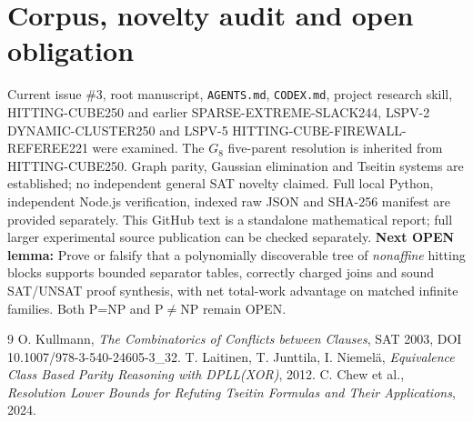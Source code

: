 \documentclass[10pt]{article}
\begin{document}
\section{Corpus, novelty audit and open obligation}
Current issue \#3, root manuscript, \texttt{AGENTS.md}, \texttt{CODEX.md}, project research skill, HITTING-CUBE250 and earlier SPARSE-EXTREME-SLACK244, LSPV-2 DYNAMIC-CLUSTER250 and LSPV-5 HITTING-CUBE-FIREWALL-REFEREE221 were examined. The $G_8$ five-parent resolution is inherited from HITTING-CUBE250. Graph parity, Gaussian elimination and Tseitin systems are established; no independent general SAT novelty claimed. Full local Python, independent Node.js verification, indexed raw JSON and SHA-256 manifest are provided separately. This GitHub text is a standalone mathematical report; full larger experimental source publication can be checked separately.
\noindent\textbf{Next OPEN lemma:} Prove or falsify that a polynomially discoverable tree of \emph{nonaffine} hitting blocks supports bounded separator tables, correctly charged joins and sound SAT/UNSAT proof synthesis, with net total-work advantage on matched infinite families. Both P=NP and P$\ne$NP remain OPEN.
\begin{thebibliography}{9}
 O. Kullmann, \emph{The Combinatorics of Conflicts between Clauses}, SAT 2003, DOI 10.1007/978-3-540-24605-3\_32.
 T. Laitinen, T. Junttila, I. Niemel\"a, \emph{Equivalence Class Based Parity Reasoning with DPLL(XOR)}, 2012.
 C. Chew et al., \emph{Resolution Lower Bounds for Refuting Tseitin Formulas and Their Applications}, 2024.
\end{thebibliography}
\end{document}

